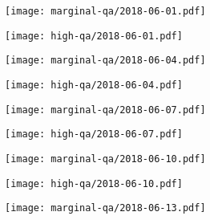 \documentclass{article}
\begin{document}
\begin{figure}[H]
	\ContinuedFloat
	\centering
	\begin{subfigure}{0.48\linewidth}
		\texttt{[image: marginal-qa/2018-06-01.pdf]}
	\end{subfigure}
	\begin{subfigure}{0.48\linewidth}
		\texttt{[image: high-qa/2018-06-01.pdf]}
	\end{subfigure}
	\begin{subfigure}{0.48\linewidth}
		\texttt{[image: marginal-qa/2018-06-04.pdf]}
	\end{subfigure}
	\begin{subfigure}{0.48\linewidth}
		\texttt{[image: high-qa/2018-06-04.pdf]}
	\end{subfigure}
	\begin{subfigure}{0.48\linewidth}
		\texttt{[image: marginal-qa/2018-06-07.pdf]}
	\end{subfigure}
	\begin{subfigure}{0.48\linewidth}
		\texttt{[image: high-qa/2018-06-07.pdf]}
	\end{subfigure}
	\begin{subfigure}{0.48\linewidth}
		\texttt{[image: marginal-qa/2018-06-10.pdf]}
	\end{subfigure}
	\begin{subfigure}{0.48\linewidth}
		\texttt{[image: high-qa/2018-06-10.pdf]}
	\end{subfigure}
	\begin{subfigure}{\linewidth}
		\hspace{0.25cm}
		\texttt{[image: marginal-qa/2018-06-13.pdf]}
	\end{subfigure}
\end{figure}
\end{document}
